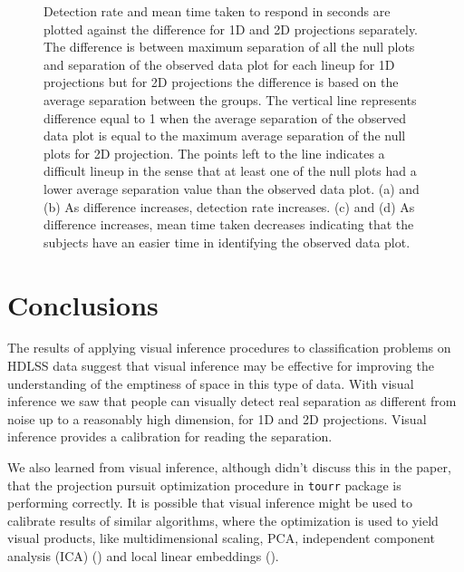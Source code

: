 \begin{figure}[htbp]
\centering
{}
\caption{Detection rate and mean time taken to respond in seconds are plotted against the difference for 1D and 2D projections separately. The difference is between maximum separation of all the null plots and separation of the observed data plot for each lineup for 1D projections but for 2D projections the difference is based on the average separation between the groups. The vertical line represents difference equal to 1 when the average separation of the observed data plot is equal to the maximum average separation of the null plots for 2D projection. The points left to the line indicates a difficult lineup in the sense that at least one of the null plots had a lower average separation value than the observed data plot. (a) and (b) As difference increases, detection rate increases. (c) and (d) As difference increases,  mean time taken decreases indicating that the subjects have an easier time in identifying the observed data plot. }
\label{null}
\end{figure}

\section{Conclusions}

The results of applying visual inference procedures to classification problems on HDLSS data suggest that visual inference may be effective for improving the understanding of the emptiness of space in this type of data. With visual inference we saw that people can visually detect real separation as different from noise up to a reasonably high dimension, for 1D and 2D projections. Visual inference provides a calibration for reading the separation. 

We also learned from visual inference, although didn't discuss this in the paper, that the projection pursuit optimization procedure in \texttt{tourr} package is performing correctly. It is possible that visual inference might be used to calibrate results of similar algorithms, where the optimization is used to yield visual products, like multidimensional scaling, PCA, independent component analysis (ICA) (\cite{comon:1994}) and local linear embeddings (\cite{roweis:2000}).

